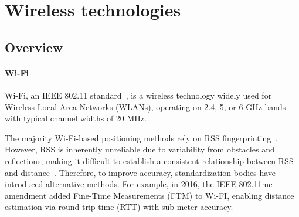 




\section{Wireless technologies}

\subsection{Overview}
\paragraph{Wi-Fi}
Wi-Fi, an IEEE 802.11 standard~\cite{ieee80211}, is a wireless technology widely used for Wireless Local Area Networks (WLANs), operating on 2.4, 5, or 6 \si{\giga\hertz} bands with typical channel widths of 20 \si{\mega\hertz}.

The majority Wi-Fi-based positioning methods rely on RSS fingerprinting~\cite{leitch2023indoor}. However, RSS is inherently unreliable due to variability from obstacles and reflections, making it difficult to establish a consistent relationship between RSS and distance~\cite{Asaad2022Review}. Therefore, to improve accuracy, standardization bodies have introduced alternative methods. For example, in 2016, the IEEE 802.11mc amendment added Fine-Time Measurements (FTM) to Wi-FI, enabling distance estimation via round-trip time (RTT) with sub-meter accuracy.

